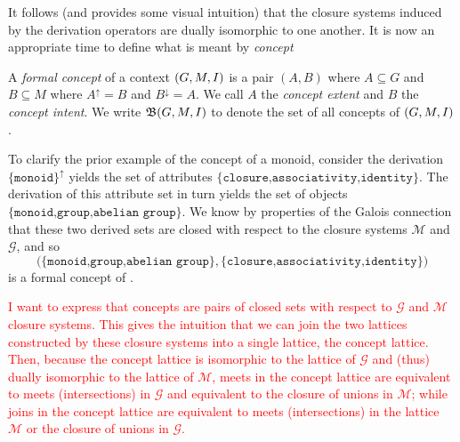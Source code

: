 It follows  (and  provides some visual intuition) that the closure systems induced by the derivation operators are dually
isomorphic to one another. It is now an appropriate time to define what is meant by \textit{concept}

\begin{definition}
  \label{definition:formal-concept}  A \emph{formal concept} of a context $(G,M,\mathrel{I})$ is a pair $(A,B)$ where $A \subseteq G$ and $B\subseteq M$ where $A^{\uparrow}= B$ and
  $B^{\downarrow}= A$. We call $A$ the \emph{concept extent} and $B$ the \emph{concept intent}. We write ${\mathfrak B} (G,M,\mathrel{I})$ to denote the set of all concepts of $(G,M,\mathrel{I})$.
\end{definition}

To clarify the prior example of the concept of a monoid, consider the derivation $\{\texttt{monoid}\}^{\uparrow}$ yields the set of attributes $\{\texttt{closure,associativity,identity}\}$. The derivation
of this attribute set in turn yields the set of objects $\{\texttt{monoid,group,abelian group}\}$. We know by properties of the Galois connection that these two derived sets are closed with respect to
the closure systems $\mathcal{M}$ and $\mathcal{G}$, and so
\[
  \big(\{\texttt{monoid,group,abelian group}\}, \{\texttt{closure,associativity,identity}\}\big)
\]
is a formal concept of .

\textcolor{red}{I want to express that concepts are pairs of closed sets with respect to $\mathcal{G}$ and $\mathcal{M}$ closure systems. This gives the intuition that we can join the two lattices constructed
by these closure systems into a single lattice, the concept lattice. Then, because the concept lattice is isomorphic to the lattice of $\mathcal{G}$ and (thus) dually isomorphic to the lattice of
$\mathcal{M}$, meets in the concept lattice are equivalent to meets (intersections) in $\mathcal{G}$ and equivalent to the closure of unions in $\mathcal{M}$; while joins in the concept lattice are
equivalent to meets (intersections) in the lattice $\mathcal{M}$ or the closure of unions in $\mathcal{G}$.}

